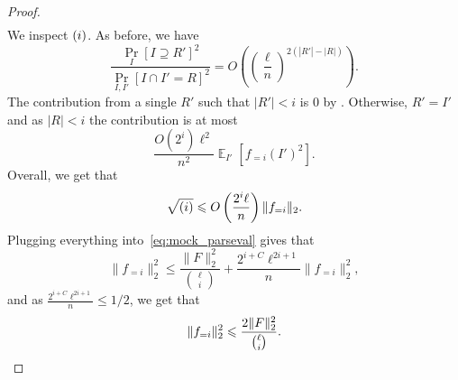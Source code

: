 \documentclass{toc}
\newcommand{\rom}[1]{\uppercase\expandafter{\romannumeral #1\relax}}
\newcommand\card[1]{\left| {#1} \right|}
\newcommand\Prob[2]{{\Pr_{#1}\left[ {#2} \right]}}
\newcommand\Expect[2]{{\mathop{\mathbb{E}}_{#1}\left[ {#2} \right]}}
\newcommand\norm[1]{\| #1 \|}
\renewcommand\leq{\leqslant}
\newcommand\lvlfn[2]{{#1}_{={#2}}}
\begin{document}
\begin{proof}
\begin{align*}
  \end{align*}
  We inspect $(\rom{1})$. As before, we have
  \[
  \frac{\Prob{I}{I\supseteq R'}^2}{\Prob{I,I'}{I\cap I' = R}^2}
  =O\left(\left(\frac{\ell}{n}\right)^{2(\card{R'}-\card{R})}\right).
  \]
  The contribution from a single $R'$ such that $\card{R'} < i$ is $0$ by . Otherwise, $R' = I'$ and as $\card{R}<i$ the contribution is at most
  \[
  \frac{O(2^i) \ell^2}{n^2}\Expect{I'}{\lvlfn{f}{i}(I')^2}.
  \]
  Overall, we get that
  \[
  \sqrt{(\rom{1})}\leq
  O\left(\frac{2^i \ell}{n}\right)\norm{\lvlfn{f}{i}}_2.
  \]
  Plugging everything into~\eqref{eq:mock_parseval} gives that
  \[
  \norm{\lvlfn{f}{i}}_2^2
  \leq
  \frac{\norm{F}_2^2}{\binom{\ell}{i}}
  +\frac{2^{i+C} \ell^{2i+1}}{n}\norm{\lvlfn{f}{i}}_2^2,
  \]
  and as $\frac{2^{i+C} \ell^{2i+1}}{n}\leq 1/2$, we get that
  \[
  \norm{\lvlfn{f}{i}}_2^2\leq \frac{2\norm{F}_2^2}{\binom{\ell}{i}}.
  \qedhere
  \]
\end{proof}

%
%
%



%
\end{document}
